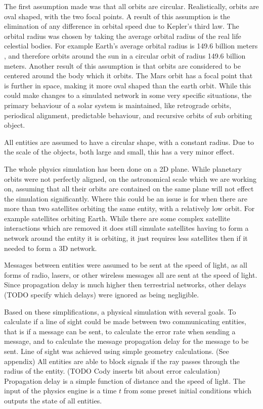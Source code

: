 \documentclass[a4paper,12pt]{article}
\begin{document}
The first assumption made was that all orbits are circular. Realistically, orbits are oval 
shaped, with the two focal points. A result of this assumption is the elimination of any 
difference in orbital speed due to Kepler's third law. The orbital radius was chosen by taking
the average orbital radius of the real life celestial bodies.
For example Earth's average orbital
radius is 149.6 billion meters \cite{}, and therefore orbits around the sun in a circular orbit
of radius 149.6 billion meters.  Another result of this assumption 
is that orbits are considered to be centered around the body which it orbits. The Mars orbit 
has a focal point that is further in space, making it more oval shaped than the earth orbit. \cite{} 
While this could make changes to a 
simulated network in some very specific situations, the primary behaviour of a solar system 
is maintained, like retrograde orbits, periodical alignment, predictable behaviour, and 
recursive orbits of sub orbiting object.

All entities are assumed to have a circular shape, with a constant radius. Due to the scale of the 
objects, both large and small, this has a very minor effect.

The whole physics simulation has been done on a 2D plane. While planetary orbits were not perfectly
aligned, on the astronomical scale which we are working on, assuming that all their orbits are 
contained on the same plane will not effect the simulation significantly. Where this could be an issue 
is for when there are more than two satellites orbiting the same entity, with a relatively low orbit. For
example satellites orbiting Earth. While there are some complex satellite interactions which are removed 
it does still simulate satellites having to form a network around the entity it is 
orbiting, it just requires less satellites then if it needed to form a 3D network. 

Messages between entities were assumed to be sent at the speed of light, as all forms of radio, lasers,
or other wireless messages all are sent at the speed of light. Since propagation delay is much higher 
then terrestrial networks, other delays (TODO specify which delays) were ignored as being negligible. 

Based on these simplifications, a physical simulation with several goals. To calculate if a line of 
sight could be made between two communicating entities, that is if a message can be sent, to calculate 
the error rate when sending a message, and to calculate the message propagation delay for the message to 
be sent. Line of sight was achieved using simple geometry calculations. (See appendix) All entities are able to block 
signals if the ray passes through the radius of the entity. (TODO Cody inserts bit about error calculation)
Propagation delay is a simple function of distance and the speed of light. The input of the physics engine 
is a time $t$ from some preset initial conditions which outputs the state of all entities.
\end{document}
